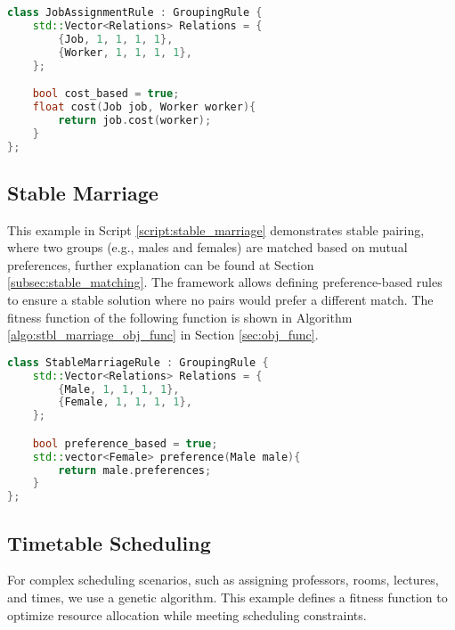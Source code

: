 \begin{lstlisting}[language=C++, caption={Creating and solving the Job Assignment Problem using this framework. The Relations vector defines a list of entitie's classes. Each entry in the vector defines the cardinality of the class in the group using four values: the source's Minimum and Maximum Multiplicity and the target's Minimum and Maximum Multiplicity. The cost function is delagated to the used implemented class Job. The \textit{job.cost} algorithm is defined in Algorithm \ref{algo:job_assign_obj_func}.}, label={script:job_assignement}]
class JobAssignmentRule : GroupingRule {
    std::Vector<Relations> Relations = {
        {Job, 1, 1, 1, 1},
        {Worker, 1, 1, 1, 1},
    };

    bool cost_based = true;
    float cost(Job job, Worker worker){
        return job.cost(worker);
    }
};
\end{lstlisting}


\subsection{Stable Marriage}
This example in Script \ref{script:stable_marriage} demonstrates stable pairing, where two groups (e.g., males and females) are matched based on mutual preferences, further explanation can be found at Section \ref{subsec:stable_matching}. The framework allows defining preference-based rules to ensure a stable solution where no pairs would prefer a different match. The fitness function of the following function is shown in Algorithm \ref{algo:stbl_marriage_obj_func} in Section \ref{sec:obj_func}.

\begin{lstlisting}[language=C++, caption={Creating and solving the Stable Marriage Problem using this framework.}, label={script:stable_marriage}]
class StableMarriageRule : GroupingRule {
    std::Vector<Relations> Relations = {
        {Male, 1, 1, 1, 1},
        {Female, 1, 1, 1, 1},
    };

    bool preference_based = true;
    std::vector<Female> preference(Male male){
        return male.preferences;
    }
};
\end{lstlisting}

\subsection{Timetable Scheduling}
For complex scheduling scenarios, such as assigning professors, rooms, lectures, and times, we use a genetic algorithm. This example defines a fitness function to optimize resource allocation while meeting scheduling constraints. 

